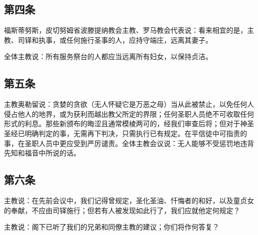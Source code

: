 
\subsection{第四条}

\par

福斯蒂努斯，皮切努姆省波滕提纳教会主教、罗马教会代表说：看来相宜的是，主教、司铎和执事，或任何施行圣事的人，应持守端庄，远离其妻子。\par

全体主教说：所有服务祭台的人都应当远离所有妇女，以保持贞洁。\par


\subsection{第五条}

\par

主教奥勒留说：贪婪的贪欲（无人怀疑它是万恶之母）当从此被禁止，以免任何人侵占他人的地界，或为获利而越出教父所定的界限；任何圣职人员绝不可收取任何形式的利息。那些新颁布的晦涩且通常模棱两可的，经我们审查后将；但对于神圣圣经已明确判定的事，无需再下判决，只需执行已有规定。在平信徒中可指责的事，在圣职人员中更应受到严厉谴责。全体主教会议说：无人能够不受惩罚地违背先知和福音中所说的话。\par


\subsection{第六条}

\par

主教说：在先前会议中，我们记得曾规定，圣化圣油、忏悔者的和好，以及童贞女的奉献，不应由司铎施行；但若有人被发现如此行了，我们应就他定何规定？\par

主教说：阁下已听了我们的兄弟和同僚主教的建议；你们将作何答复？\par

